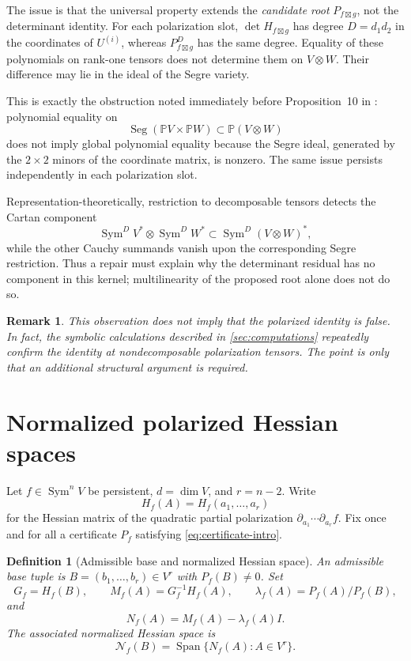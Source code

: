 \documentclass[11pt]{amsart}
\newtheorem{remark}[theorem]{Remark}
\newtheorem{definition}[theorem]{Definition}
\newcommand{\PP}{\mathbb P}
\newcommand{\Sym}{\operatorname{Sym}}
\newcommand{\Seg}{\operatorname{Seg}}
\newcommand{\Span}{\operatorname{Span}}
\newcommand{\boxt}{\mathbin{\boxtimes}}
\newcommand{\Nsp}{\mathcal N}
\begin{document}
The issue is that the universal property extends the \emph{candidate root}
$P_{f\boxt g}$, not the determinant identity.  For each polarization slot,
$\det H_{f\boxt g}$ has degree $D=d_1d_2$ in the coordinates of
$U^{(i)}$, whereas $P_{f\boxt g}^D$ has the same degree.  Equality of these
polynomials on rank-one tensors does not determine them on $V\otimes W$.
Their difference may lie in the ideal of the Segre variety.

This is exactly the obstruction noted immediately before Proposition~10 in
\cite[Remark~9]{G26}: polynomial equality on
\[
 \Seg(\PP V\times\PP W)\subset\PP(V\otimes W)
\]
does not imply global polynomial equality because the Segre ideal, generated
by the $2\times2$ minors of the coordinate matrix, is nonzero.  The same issue
persists independently in each polarization slot.

Representation-theoretically, restriction to decomposable tensors detects the
Cartan component
\[
 \Sym^D V^*\otimes\Sym^D W^*
 \subset \Sym^D(V\otimes W)^*,
\]
while the other Cauchy summands vanish upon the corresponding Segre
restriction.  Thus a repair must explain why the determinant residual has no
component in this kernel; multilinearity of the proposed root alone does not do
so.

\begin{remark}
This observation does not imply that the polarized identity is false.  In fact,
the symbolic calculations described in \cref{sec:computations} repeatedly
confirm the identity at nondecomposable polarization tensors.  The point is only
that an additional structural argument is required.
\end{remark}

\section{Normalized polarized Hessian spaces}

Let $f\in\Sym^n V$ be persistent, $d=\dim V$, and $r=n-2$.  Write
\[
 H_f(A)=H_f(a_1,\ldots,a_r)
\]
for the Hessian matrix of the quadratic partial polarization
$\partial_{a_1}\cdots\partial_{a_r}f$.  Fix once and for all a certificate
$P_f$ satisfying \eqref{eq:certificate-intro}.

\begin{definition}[Admissible base and normalized Hessian space]
An \emph{admissible base tuple} is $B=(b_1,\ldots,b_r)\in V^r$ with
$P_f(B)\neq0$.  Set
\[
 G_f=H_f(B),\qquad
 M_f(A)=G_f^{-1}H_f(A),\qquad
 \lambda_f(A)=P_f(A)/P_f(B),
\]
and
\begin{equation}\label{eq:N-def}
 N_f(A)=M_f(A)-\lambda_f(A)I.
\end{equation}
The associated normalized Hessian space is
\[
 \Nsp_f(B)=\Span\{N_f(A):A\in V^r\}.
\]
\end{definition}
\end{document}

